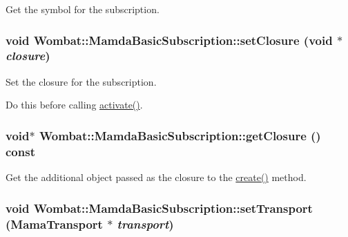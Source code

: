 Get the symbol for the subscription. 

\hypertarget{classWombat_1_1MamdaBasicSubscription_6d23691eadd41cac4ce2f3469290e674}{
\subsubsection[setClosure]{\setlength{\rightskip}{0pt plus 5cm}void Wombat::Mamda\-Basic\-Subscription::set\-Closure (void $\ast$ {\em closure})}}
\label{classWombat_1_1MamdaBasicSubscription_6d23691eadd41cac4ce2f3469290e674}


Set the closure for the subscription. 

Do this before calling \hyperlink{classWombat_1_1MamdaBasicSubscription_704ba0b8ec4c027d0357d3e482314605}{activate()}. \hypertarget{classWombat_1_1MamdaBasicSubscription_53fc877dc1f0050f49fd565726c22893}{
\subsubsection[getClosure]{\setlength{\rightskip}{0pt plus 5cm}void$\ast$ Wombat::Mamda\-Basic\-Subscription::get\-Closure () const}}
\label{classWombat_1_1MamdaBasicSubscription_53fc877dc1f0050f49fd565726c22893}


Get the additional object passed as the closure to the \hyperlink{classWombat_1_1MamdaBasicSubscription_3c27e4c6bf7b6c23464049840aff22e0}{create()} method. 

\hypertarget{classWombat_1_1MamdaBasicSubscription_0d1173c5d3fc9dcfde323417ef8c9fbd}{
\subsubsection[setTransport]{\setlength{\rightskip}{0pt plus 5cm}void Wombat::Mamda\-Basic\-Subscription::set\-Transport (Mama\-Transport $\ast$ {\em transport})}}
\label{classWombat_1_1MamdaBasicSubscription_0d1173c5d3fc9dcfde323417ef8c9fbd}


